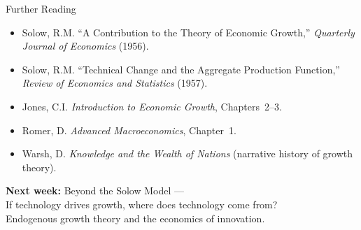 \documentclass[aspectratio=169, 10pt]{beamer}
\begin{document}
\begin{frame}{Further Reading}
\begin{itemize}
  \item Solow, R.M. ``A Contribution to the Theory of Economic Growth,''
        \textit{Quarterly Journal of Economics} (1956).
  \item Solow, R.M. ``Technical Change and the Aggregate Production Function,''
        \textit{Review of Economics and Statistics} (1957).
  \item Jones, C.I. \textit{Introduction to Economic Growth}, Chapters~2--3.
  \item Romer, D. \textit{Advanced Macroeconomics}, Chapter~1.
  \item Warsh, D. \textit{Knowledge and the Wealth of Nations}
        (narrative history of growth theory).
\end{itemize}
\vspace{1em}
\begin{center}
\textbf{Next week:} Beyond the Solow Model ---\\
If technology drives growth, where does technology come from?\\
Endogenous growth theory and the economics of innovation.
\end{center}
\end{frame}
\end{document}
